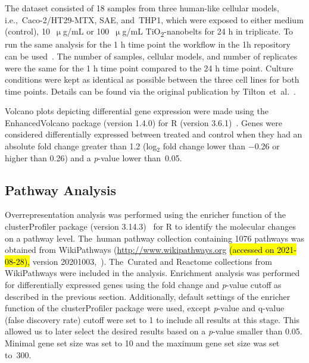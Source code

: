 \documentclass[ijms,article,accept,moreauthors,pdftex]{Definitions/mdpi}
\begin{document}
\begin{paracol}{2}
The dataset consisted of 18 samples from three human-like {cellular models}, i.e.,~{Caco-2/HT29-MTX}, SAE, and~THP1, which were exposed to either medium (control), 10~$\upmu$g/mL or 100~$\upmu$g/mL TiO\textsubscript{2}-nanobelts for 24 h in triplicate. {To run the same analysis for the 1 h time point the workflow in the 1h repository can be} used~\cite{TiO2-scripts-1h}. {The number of samples, cellular models, and number of replicates were the same for the 1 h time point compared to the 24 h time point.} Culture conditions were kept as identical as possible between the three cell lines {for both time points}. Details can be found via the original publication by \mbox{Tilton~{et al.}~\cite{Tilton2013}.}

Volcano plots depicting differential gene expression were made using the EnhancedVolcano package (version 1.4.0) for R (version 3.6.1)~\cite{R2020,VolcanoPlot}. Genes were considered differentially expressed between treated and control when they had an absolute fold change greater than 1.2 (log$_{2}$ fold change lower than $-$0.26 or higher than 0.26) and a \emph{p}-value lower than~0.05. 

\subsection{Pathway Analysis}
Overrepresentation analysis was performed using the enricher function of the clusterProfiler package (version 3.14.3)~\cite{Yu2012} for R to identify the molecular changes on a pathway level. The~human pathway collection containing 1076 pathways was obtained from WikiPathways (\url{http://www.wikipathways.org} \hl{(accessed on 2021-08-28),} %
 version 20201003,~\cite{Martens2020}). The~Curated and Reactome collections from WikiPathways were included in the analysis. Enrichment analysis was performed for differentially expressed genes using the fold change and \emph{p}-value cutoff as described in the previous section. Additionally, default settings of the enricher function of the clusterProfiler package were used, except \emph{p}-value and q-value (false discovery rate) cutoff were set to 1 to include all results at this stage. This allowed us to later select the desired results based on a \emph{p}-value smaller than 0.05. Minimal gene set size was set to 10 and the maximum gene set size was set to~300.


\end{paracol}
\end{document}
